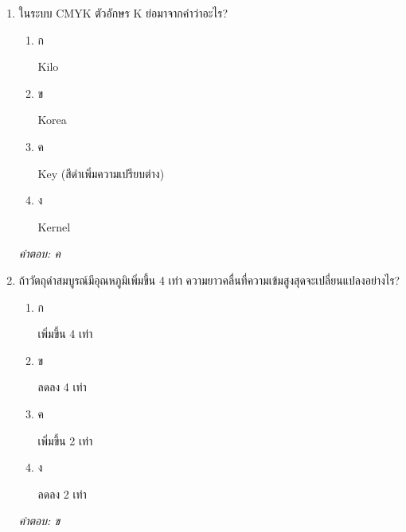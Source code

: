 \documentclass[12pt]{article}
\begin{document}
\begin{enumerate}[label=\arabic*., itemsep=0.5\baselineskip, topsep=0.5\baselineskip, leftmargin=*]
\item ในระบบ CMYK ตัวอักษร K ย่อมาจากคำว่าอะไร?
\begin{enumerate}[label=\alph*)., itemsep=0.3\baselineskip, topsep=0.3\baselineskip]
\item ก\ 
\begin{minipage}[t]{0.9\linewidth}
\raggedright Kilo
\end{minipage}
\item ข\ 
\begin{minipage}[t]{0.9\linewidth}
\raggedright Korea
\end{minipage}
\item ค\ 
\begin{minipage}[t]{0.9\linewidth}
\raggedright Key (สีดำเพิ่มความเปรียบต่าง)
\end{minipage}
\item ง\ 
\begin{minipage}[t]{0.9\linewidth}
\raggedright Kernel
\end{minipage}
\end{enumerate}
\vspace{-0.3\baselineskip}
\begin{small}
\textit{คำตอบ: ค}
\end{small}

\item ถ้าวัตถุดำสมบูรณ์มีอุณหภูมิเพิ่มขึ้น 4 เท่า ความยาวคลื่นที่ความเข้มสูงสุดจะเปลี่ยนแปลงอย่างไร?
\begin{enumerate}[label=\alph*)., itemsep=0.3\baselineskip, topsep=0.3\baselineskip]
\item ก\ 
\begin{minipage}[t]{0.9\linewidth}
\raggedright เพิ่มขึ้น 4 เท่า
\end{minipage}
\item ข\ 
\begin{minipage}[t]{0.9\linewidth}
\raggedright ลดลง 4 เท่า
\end{minipage}
\item ค\ 
\begin{minipage}[t]{0.9\linewidth}
\raggedright เพิ่มขึ้น 2 เท่า
\end{minipage}
\item ง\ 
\begin{minipage}[t]{0.9\linewidth}
\raggedright ลดลง 2 เท่า
\end{minipage}
\end{enumerate}
\vspace{-0.3\baselineskip}
\begin{small}
\textit{คำตอบ: ข}
\end{small}


\end{enumerate}
\end{document}
